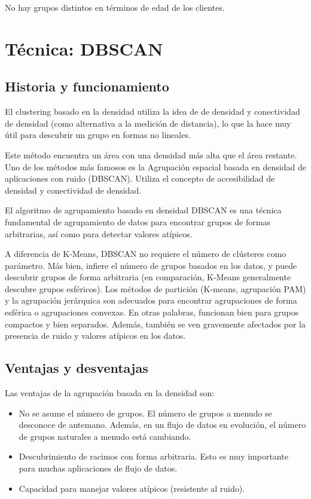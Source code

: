 \documentclass[12pt, fleqn]{report}                             %
\theoremstyle{break}                                            %
\begin{document}
            No hay grupos distintos en términos de edad de los clientes.

    \clearpage
    \section{Técnica: DBSCAN}
        \subsection{Historia y funcionamiento}

        El clustering basado en la densidad utiliza la idea de de densidad y conectividad de densidad
        (como alternativa a la medición de distancia), lo que la hace muy útil para descubrir un grupo en 
        formas no lineales. 
        
        Este método encuentra un área con una densidad más alta que el área restante. 
        Uno de los métodos más famosos es la Agrupación espacial basada en densidad de aplicaciones con ruido 
        (DBSCAN). Utiliza el concepto de accesibilidad de densidad y conectividad de densidad.

        El algoritmo de agrupamiento basado en densidad DBSCAN es una técnica fundamental de agrupamiento de datos para 
        encontrar grupos de formas arbitrarias, así como para detectar valores atípicos.

        A diferencia de K-Means, DBSCAN no requiere el número de clústeres como parámetro. Más bien, infiere el número 
        de grupos basados en los datos, y puede descubrir grupos de forma arbitraria (en comparación, K-Means 
        generalmente descubre grupos esféricos). Los métodos de partición (K-means, agrupación PAM) y la agrupación 
        jerárquica son adecuados para encontrar agrupaciones de forma esférica o agrupaciones convexas. En otras palabras,
        funcionan bien para grupos compactos y bien separados. Además, también se ven gravemente afectados por 
        la presencia de ruido y valores atípicos en los datos.

        \subsection{Ventajas y desventajas}

        Las ventajas de la agrupación basada en la densidad son:
        \begin{itemize}
            \item No se asume el número de grupos. El número de grupos a menudo se desconoce de antemano. 
            Además, en un flujo de datos en evolución, el número de grupos naturales a menudo está cambiando.
            \item Descubrimiento de racimos con forma arbitraria. Esto es muy importante para muchas aplicaciones de flujo de datos.
            \item Capacidad para manejar valores atípicos (resistente al ruido).
        \end{itemize}
\end{document}
